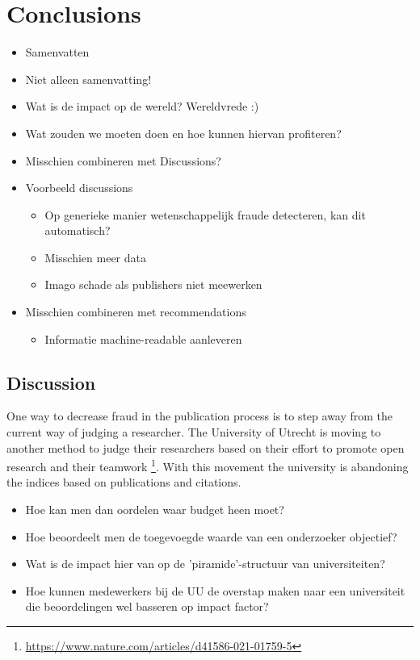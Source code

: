 \documentclass{ou-report}
\newcommand{\outline}[1]{{\color{blue} #1}}
\begin{document}
\chapter{Conclusions}
\outline{
\begin{itemize}
    \item Samenvatten
    \item Niet alleen samenvatting!
    \item Wat is de impact op de wereld? Wereldvrede :)
    \item Wat zouden we moeten doen en hoe kunnen hiervan profiteren?
    \item Misschien combineren met Discussions?
    \item Voorbeeld discussions
    \begin{itemize}
        \item Op generieke manier wetenschappelijk fraude detecteren, kan dit automatisch?
        \item Misschien meer data
        \item Imago schade als publishers niet meewerken
    \end{itemize}
    \item Misschien combineren met recommendations
    \begin{itemize}
        \item Informatie machine-readable aanleveren
    \end{itemize}
\end{itemize}
\section{Discussion}
One way to decrease fraud in the publication process is to step away from the
current way of judging a researcher. The University of Utrecht is moving to 
another method to judge their researchers based on their effort to promote open
research and their teamwork 
\footnote{\url{https://www.nature.com/articles/d41586-021-01759-5}}. With this 
movement the university is abandoning the indices based on publications and 
citations.
\begin{itemize}
    \item Hoe kan men dan oordelen waar budget heen moet?
    \item Hoe beoordeelt men de toegevoegde waarde van een onderzoeker 
    objectief?
    \item Wat is de impact hier van op de 'piramide'-structuur van 
    universiteiten?
    \item Hoe kunnen medewerkers bij de UU de overstap maken naar een 
    universiteit die beoordelingen wel basseren op impact factor?
    
\end{itemize}
}
\end{document}
